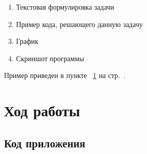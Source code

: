 \documentclass[12pt,a4paper]{scrartcl}
\begin{document}
	\begin{enumerate}
		\item Текстовая формулировка задачи
		\item Пример кода, решающего данную задачу
		\item График
		\item Скриншот программы
	\end{enumerate}
	
	Пример приведен в пункте ~\ref{sec:exp} на стр.~\pageref{sec:exp}.
	
	\section{Ход работы}
	\label{sec:exp}
	
	\subsection{Код приложения}
	\label{sec:exp:code}
\end{document}
